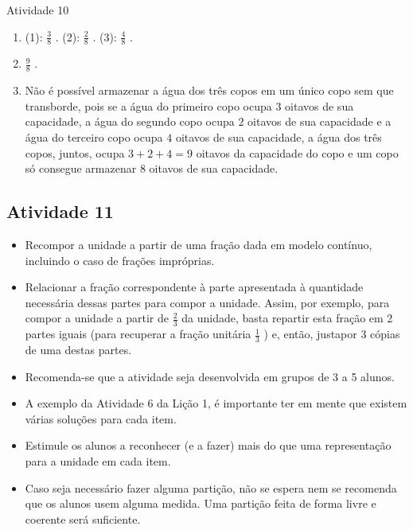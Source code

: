 \documentclass[oneside]{book}
\begin{document}
\begin{multicols}{2}
\begin{resposta*}{Atividade 10}
\begin{enumerate} [\quad a)] %
    \item       (1):       $\frac{3}{8}$      . (2):       $\frac{2}{8}$      . (3):       $\frac{4}{8}$      .
    \item             $\frac{9}{8}$      .
    \item       Não é possível armazenar a água dos três copos em um único copo sem que transborde, pois se a água do primeiro copo ocupa       $3$       oitavos de sua capacidade, a água do segundo copo ocupa       $2$       oitavos de sua capacidade e a água do terceiro copo ocupa       $4$       oitavos de sua capacidade, a água dos três copos, juntos, ocupa       $3 + 2 + 4 = 9$       oitavos da capacidade do copo e um copo só consegue armazenar       $8$       oitavos de sua capacidade.
\end{enumerate} %

\end{resposta*}



\subsection{Atividade 11}

   \vspace{.1cm}

  \begin{itemize} %
    \item       Recompor a unidade a partir de uma fração dada em modelo contínuo, incluindo o caso de frações impróprias.
    \item       Relacionar a fração correspondente à parte apresentada à quantidade necessária dessas partes para compor a unidade. Assim, por exemplo, para compor a unidade a partir de       $\frac{2}{3}$       da unidade, basta repartir esta fração em 2 partes iguais (para recuperar a fração unitária       $\frac{1}{3}$      ) e, então, justapor 3 cópias de uma destas partes.
\end{itemize} %

  \vspace{.1cm} \vspace{.1cm}

  \begin{itemize} %
    \item       Recomenda-se que a atividade seja desenvolvida em grupos de 3 a 5 alunos.
    \item       A exemplo da Atividade 6 da Lição 1, é importante ter em mente que existem várias soluções para cada item.
    \item       Estimule os alunos a reconhecer (e a fazer) mais do que uma representação para a unidade em cada item.
    \item       Caso seja necessário fazer alguma partição, não se espera nem se recomenda que os alunos usem alguma medida. Uma partição feita de forma livre e coerente será suficiente.
\end{itemize} %


\end{multicols}
\end{document}
